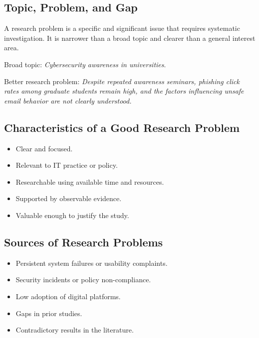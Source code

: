 \documentclass[11pt,a4paper]{article}
\begin{document}
\subsection{Topic, Problem, and Gap}

\begin{definitionbox}
A research problem is a specific and significant issue that requires systematic investigation. It is narrower than a broad topic and clearer than a general interest area.
\end{definitionbox}

\begin{examplebox}
Broad topic: \emph{Cybersecurity awareness in universities}.

Better research problem: \emph{Despite repeated awareness seminars, phishing click rates among graduate students remain high, and the factors influencing unsafe email behavior are not clearly understood.}
\end{examplebox}

\subsection{Characteristics of a Good Research Problem}

\begin{itemize}[leftmargin=*]
  \item Clear and focused.
  \item Relevant to IT practice or policy.
  \item Researchable using available time and resources.
  \item Supported by observable evidence.
  \item Valuable enough to justify the study.
\end{itemize}

\subsection{Sources of Research Problems}

\begin{itemize}[leftmargin=*]
  \item Persistent system failures or usability complaints.
  \item Security incidents or policy non-compliance.
  \item Low adoption of digital platforms.
  \item Gaps in prior studies.
  \item Contradictory results in the literature.
\end{itemize}
\end{document}
